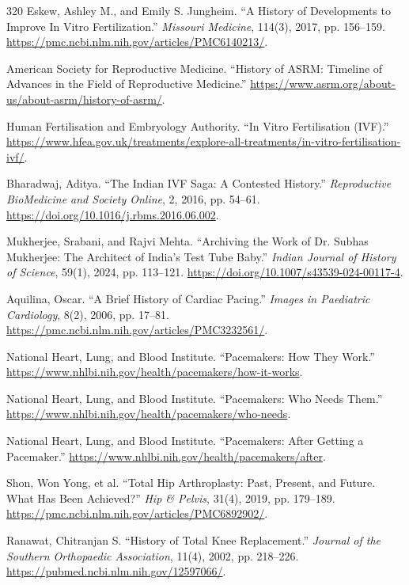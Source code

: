 \documentclass[12pt,oneside]{book}
\begin{document}
\begin{thebibliography}{320}
Eskew, Ashley M., and Emily S. Jungheim. ``A History of Developments to
Improve In Vitro Fertilization.'' \emph{Missouri Medicine}, 114(3), 2017,
pp. 156--159.
\url{https://pmc.ncbi.nlm.nih.gov/articles/PMC6140213/}.

American Society for Reproductive Medicine. ``History of ASRM: Timeline of
Advances in the Field of Reproductive Medicine.''
\url{https://www.asrm.org/about-us/about-asrm/history-of-asrm/}.

Human Fertilisation and Embryology Authority. ``In Vitro Fertilisation
(IVF).'' \url{https://www.hfea.gov.uk/treatments/explore-all-treatments/in-vitro-fertilisation-ivf/}.

Bharadwaj, Aditya. ``The Indian IVF Saga: A Contested History.''
\emph{Reproductive BioMedicine and Society Online}, 2, 2016, pp. 54--61.
\url{https://doi.org/10.1016/j.rbms.2016.06.002}.

Mukherjee, Srabani, and Rajvi Mehta. ``Archiving the Work of Dr. Subhas
Mukherjee: The Architect of India's Test Tube Baby.'' \emph{Indian Journal
of History of Science}, 59(1), 2024, pp. 113--121.
\url{https://doi.org/10.1007/s43539-024-00117-4}.

Aquilina, Oscar. ``A Brief History of Cardiac Pacing.'' \emph{Images in
Paediatric Cardiology}, 8(2), 2006, pp. 17--81.
\url{https://pmc.ncbi.nlm.nih.gov/articles/PMC3232561/}.

National Heart, Lung, and Blood Institute. ``Pacemakers: How They Work.''
\url{https://www.nhlbi.nih.gov/health/pacemakers/how-it-works}.

National Heart, Lung, and Blood Institute. ``Pacemakers: Who Needs Them.''
\url{https://www.nhlbi.nih.gov/health/pacemakers/who-needs}.

National Heart, Lung, and Blood Institute. ``Pacemakers: After Getting a
Pacemaker.'' \url{https://www.nhlbi.nih.gov/health/pacemakers/after}.

Shon, Won Yong, et al. ``Total Hip Arthroplasty: Past, Present, and Future.
What Has Been Achieved?'' \emph{Hip \& Pelvis}, 31(4), 2019, pp. 179--189.
\url{https://pmc.ncbi.nlm.nih.gov/articles/PMC6892902/}.

Ranawat, Chitranjan S. ``History of Total Knee Replacement.'' \emph{Journal
of the Southern Orthopaedic Association}, 11(4), 2002, pp. 218--226.
\url{https://pubmed.ncbi.nlm.nih.gov/12597066/}.


\end{thebibliography}
\end{document}
